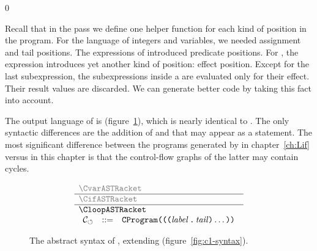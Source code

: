 \documentclass[7x10]{TimesAPriori_MIT}%
\newcommand{\gray}[1]{{\color{gray} #1}}
\def\racketEd{0}
\def\edition{1}
\numberwithin{theorem}{chapter}
\numberwithin{definition}{chapter}
\numberwithin{equation}{chapter}
\begin{document}
{\if\edition\racketEd

Recall that in the  pass we define one helper
function for each kind of position in the program.  For the \LangVarANF{}
language of integers and variables, we needed assignment and tail
positions. The  expressions of \LangIfANF{} introduced predicate
positions. For \LangLoopANF{}, the  expression introduces yet
another kind of position: effect position. Except for the last
subexpression, the subexpressions inside a  are evaluated
only for their effect. Their result values are discarded. We can
generate better code by taking this fact into account.

The output language of  is \LangCLoop{}
(figure~\ref{fig:c7-syntax}), which is nearly identical to
\LangCIf{}. The only syntactic differences are the addition of \VOID{}
and that  may appear as a statement.  The most significant
difference between the programs generated by 
in chapter~\ref{ch:Lif} versus  in this
chapter is that the control-flow graphs of the latter may contain
cycles.

\begin{figure}[tp]
\begin{tcolorbox}[colback=white]    
\small
\[
\begin{array}{l}
  \gray{\CvarASTRacket} \\ \hline
  \gray{\CifASTRacket} \\ \hline
  \CloopASTRacket \\
\begin{array}{lcl}
\LangCLoopM{} & ::= & \CPROGRAM{\itm{info}}{\LP\LP\itm{label}\,\key{.}\,\Tail\RP\ldots\RP}
\end{array}
\end{array}
\]
\end{tcolorbox}

\caption{The abstract syntax of \LangCLoop{}, extending \LangCIf{} (figure~\ref{fig:c1-syntax}).}
\label{fig:c7-syntax}
\end{figure}

}
\end{document}
